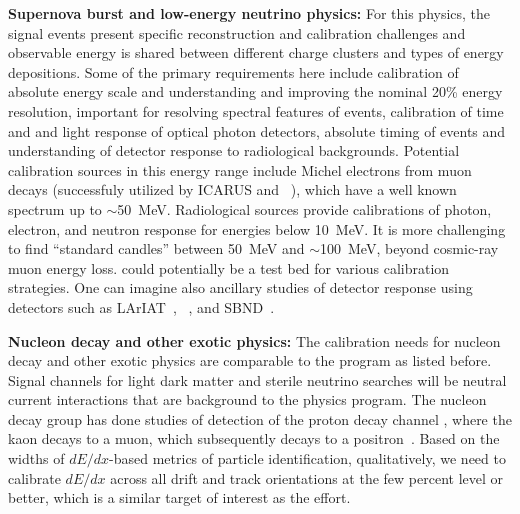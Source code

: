\textbf{Supernova burst and low-energy neutrino physics:} For this physics, the signal events present specific reconstruction and calibration challenges and observable energy is shared between different charge clusters and types of energy depositions. Some of the primary requirements here include calibration of absolute energy scale and 
understanding and improving the nominal 20\% energy resolution, important for resolving spectral features of  events,
calibration of time and and light response of optical photon detectors, absolute timing of events and understanding of detector response to radiological backgrounds. Potential calibration sources in this energy range include Michel electrons from muon decays (successfuly utilized by ICARUS and ~\cite{Acciarri:2017sjy}), which have a well known spectrum up to $\sim$50~MeV. Radiological sources provide calibrations of photon, electron, and neutron response for energies below \SI{10}{\MeV}. It is more challenging to find ``standard candles'' between 50~MeV and $\sim$\SI{100}{\MeV}, beyond cosmic-ray muon energy loss.  could potentially be a test bed for various calibration strategies. One can imagine also ancillary studies of detector response using detectors such as LArIAT~\cite{Cavanna:2014iqa}, ~\cite{Acciarri:2016smi}, and SBND~\cite{Antonello:2015lea}. %

\textbf{Nucleon decay and other exotic physics:} The calibration needs for nucleon decay and other exotic physics are comparable to the  program as listed before. Signal channels for light dark matter and sterile neutrino searches will be neutral current interactions that are background to the  physics program. The nucleon decay group has done studies of detection of the proton decay channel \ptoknubar, %
where the kaon decays to a muon, which subsequently decays to a positron~\cite{protondecaywidths}. Based on the widths of $dE/dx$-based metrics of particle identification, qualitatively, we need to calibrate $dE/dx$ across all drift and track orientations at the few percent level or better, which is a similar target of interest as the  effort.

